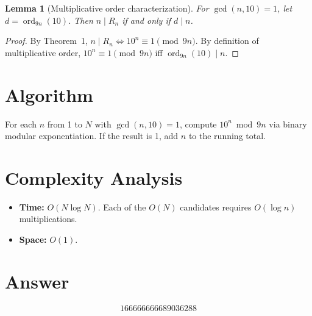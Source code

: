\documentclass[11pt]{article}
\newtheorem{lemma}[theorem]{Lemma}
\begin{document}
\begin{lemma}[Multiplicative order characterization]
For $\gcd(n, 10) = 1$, let $d = \operatorname{ord}_{9n}(10)$. Then $n \mid R_n$ if and only if $d \mid n$.
\end{lemma}

\begin{proof}
By Theorem~1, $n \mid R_n \iff 10^n \equiv 1 \pmod{9n}$. By definition of multiplicative order, $10^n \equiv 1 \pmod{9n}$ iff $\operatorname{ord}_{9n}(10) \mid n$.
\end{proof}

\section{Algorithm}

For each $n$ from 1 to $N$ with $\gcd(n, 10) = 1$, compute $10^n \bmod 9n$ via binary modular exponentiation. If the result is 1, add $n$ to the running total.

\section{Complexity Analysis}

\begin{itemize}
\item \textbf{Time:} $O(N \log N)$. Each of the $O(N)$ candidates requires $O(\log n)$ multiplications.
\item \textbf{Space:} $O(1)$.
\end{itemize}

\section{Answer}

\[
\boxed{166666666689036288}
\]
\end{document}
